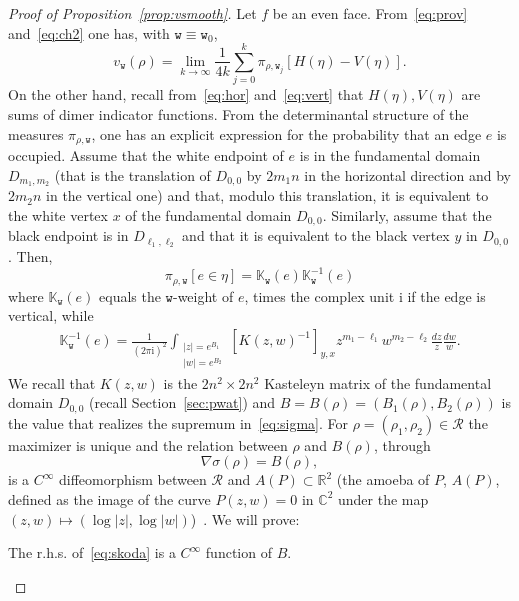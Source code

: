 \documentclass[AHL,Unicode,longabstracts,published]{cedram}
\newcommand{\ttw}{\mathtt{w}}
\newcommand{\bbC}{\mathbb{C}}
\newcommand{\bbR}{\mathbb{R}}
\newcommand{\bbK}{\mathbb{K}}
\newcommand{\clR}{\mathcal{R}}
\newcommand{\rmi}{\mathrm{i}}
\newcommand{\ttw}{\mathtt{w}}
\begin{document}
\begin{proof}[{Proof of Proposition~\ref{prop:vsmooth}}]
Let $f$ be an even face. From~\eqref{eq:prov} and~\eqref{eq:ch2} one has, with $\ttw\equiv \ttw_0$,
\begin{equation}\label{eq:cisiamoquasi}
v_{\ttw}(\rho)=\lim_{k\to\infty}\frac1{4k} \sum_{j=0}^k\pi_{\rho,\ttw_j}\left[H(\eta)-V(\eta)\right].
\end{equation}
On the other hand, recall from~\eqref{eq:hor} and~\eqref{eq:vert} that $H(\eta),V(\eta)$ are sums of dimer indicator functions. From the determinantal structure of the measures $\pi_{\rho,\ttw}$, one has an explicit expression for the probability that an edge $e$ is occupied. Assume that the white endpoint of $e$ is in the fundamental domain $D_{m_1,m_2}$ (that is the translation of $D_{0,0}$ by $2m_1 n$ in the horizontal direction and by $2 m_2 n$ in the vertical one) and that, modulo this translation, it is equivalent to the white vertex $x$ of the fundamental domain $D_{0,0}$. Similarly, assume that the black endpoint is in $D_{\ell_1,\ell_2}$ and that it is equivalent to the black vertex $y$ in $D_{0,0}$. Then,
\begin{equation}\label{eq:Ksol}
\pi_{\rho,\ttw}[e\in \eta]= \bbK_{\ttw}(e)\bbK^{-1}_{\ttw}(e)
\end{equation}
where $\bbK_{\ttw}(e)$ equals the $\ttw$-weight of $e$, times the complex unit $\rmi$ if the edge is vertical, while
\begin{align}\label{eq:skoda}
\bbK_{\ttw}^{-1}(e)= \frac1{(2\pi \rmi)^2}\int_{\substack{ |z|=e^{B_1} \\|w|=e^{B_2}}} \left[K(z,w)^{-1}\right]_{y,x} z^{m_1-\ell_1}w^{m_2-\ell_2}\frac{dz}{z} \frac{dw}{w}.
\end{align}
We recall that $K(z,w)$ is the $2 n^2\times 2n^2$ Kasteleyn matrix of the fundamental domain $D_{0,0}$ (recall Section~\ref{sec:pwat}) and $B=B(\rho)= (B_1(\rho),B_2(\rho))$ is the value that realizes the supremum in~\eqref{eq:sigma}. For $\rho=(\rho_1,\rho_2)\in \clR$ the maximizer is unique and the relation between $\rho$ and $B(\rho)$, through
\begin{equation}\label{eq:srBr}
\nabla \sigma(\rho)=B(\rho),
\end{equation}
is a $C^\infty$ diffeomorphism between $\clR$ and $A(P)\subset \bbR^2$ (the amoeba of $P$, $A(P)$, defined as the image of the curve $P(z,w)=0$ in $\bbC^2$ under the map $(z,w)\mapsto (\log |z|, \log |w|)$)~\cite{Kenyon2003}. We will prove:
\begin{lemm}\label{lemma:Cinft}
The r.h.s. of~\eqref{eq:skoda} is a $C^\infty$ function of $B$.
\end{lemm}


\end{proof}
\end{document}
